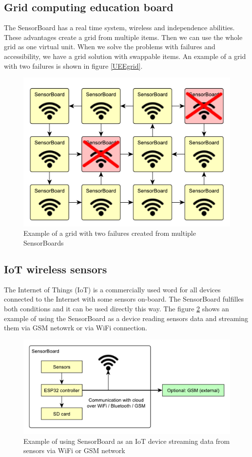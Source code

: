 \subsection{Grid computing education board}
The SensorBoard has a real time system, wireless and independence abilities. These advantages create a grid from multiple items. Then we can use the whole grid as one virtual unit. When we solve the problems with failures and accessibility, we have a grid solution with swappable items. An example of a grid with two failures is shown in figure \ref{UEEgrid}.

\begin{figure}[H]
	\centering
	\label{UEgrid}
	\caption{Example of a grid with two failures created from multiple SensorBoards}
	\includegraphics[width=16cm]{img/UsageExamplesGrid.pdf}
\end{figure}

\subsection{IoT wireless sensors}
The Internet of Things (IoT) is a commercially used word for all devices connected to the Internet with some sensors on-board. The SensorBoard fulfilles both conditions and it can be used directly this way. The figure \ref{UEIoT} shows an example of using the SensorBoard as a device reading sensors data and streaming them via GSM netowrk or via WiFi connection.

\begin{figure}[H]
	\centering
	\label{UEIoT}
	\caption{Example of using SensorBoard as an IoT device streaming data from sensors via WiFi or GSM network}
	\includegraphics[width=16cm]{img/UsageExamplesIoT.pdf}
\end{figure}

